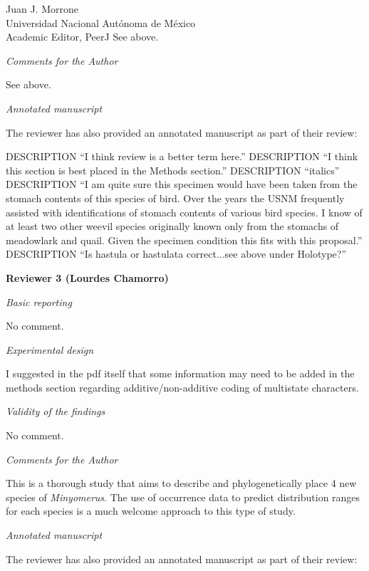 \documentclass[10pt,letterpaper]{letter}
\makeatletter
\newcommand{\DESCRIPTION@original@item}{}
\let\DESCRIPTION@original@item\item
\newcommand*{\DESCRIPTION@envir}{DESCRIPTION}
\newlength{\DESCRIPTION@totalleftmargin}
\newlength{\DESCRIPTION@linewidth}
\newcommand{\DESCRIPTION@makelabel}[1]{\llap{#1}}%
\newcommand{\DESCRIPTION@item}[1][]{%
  \setlength{\@totalleftmargin}%
       {\DESCRIPTION@totalleftmargin+\widthof{\textbf{#1 }}-\leftmargin}%
  \setlength{\linewidth}
       {\DESCRIPTION@linewidth-\widthof{\textbf{#1 }}+\leftmargin}%
  \par\parshape \@ne \@totalleftmargin \linewidth
  \DESCRIPTION@original@item[\textbf{#1}]%
}
\newenvironment{DESCRIPTION}
  {\list{}{\setlength{\labelwidth}{0cm}%
           \let\makelabel\DESCRIPTION@makelabel}%
   \setlength{\DESCRIPTION@totalleftmargin}{\@totalleftmargin}%
   \setlength{\DESCRIPTION@linewidth}{\linewidth}%
   \renewcommand{\item}{\ifx\@currenvir\DESCRIPTION@envir
                           \expandafter\DESCRIPTION@item
                        \else
                           \expandafter\DESCRIPTION@original@item
                        \fi}}
  {\endlist}
\makeatother
\begin{document}
\begin{letter}{Juan J. Morrone\\Universidad Nacional Aut\'{o}noma de M\'{e}xico\\Academic Editor, PeerJ}
	See above.
	
	\emph{Comments for the Author}
	
	See above.
	
	\emph{Annotated manuscript}
	
	The reviewer has also provided an annotated manuscript as part of their review:
	
	\begin{DESCRIPTION}
		\item[Line 17:] ``I think review is a better term here.''
		\item[Lines 28--40:] ``I think this section is best placed in the Methods section.''
		\item[Line 200:] ``italics''
		\item[Lines 320--323:] ``I am quite sure this specimen would have been taken from the stomach contents of this species of bird.
			Over the years the USNM frequently assisted with identifications of stomach contents of various bird species.
			I know of at least two other weevil species originally known only from the stomachs of meadowlark and quail.
			Given the specimen condition this fits with this proposal.''
		\item[Lines 440, 451:] ``Is hastula or hastulata correct...see above under Holotype?''
	\end{DESCRIPTION}
	
	\newpage

	\textbf{Reviewer 3 (Lourdes Chamorro)}
	
	\emph{Basic reporting}
	
	No comment.
	
	\emph{Experimental design}
	
	I suggested in the pdf itself that some information may need to be added in the methods section regarding additive/non-additive coding of multistate characters.
	
	\emph{Validity of the findings}
	
	No comment.
	
	\emph{Comments for the Author}
	
	This is a thorough study that aims to describe and phylogenetically place 4 new species of \textit{Minyomerus}.
	The use of occurrence data to predict distribution ranges for each species is a much welcome approach to this type of study.
	
	\emph{Annotated manuscript}
	
	The reviewer has also provided an annotated manuscript as part of their review:
	

\end{letter}
\end{document}
